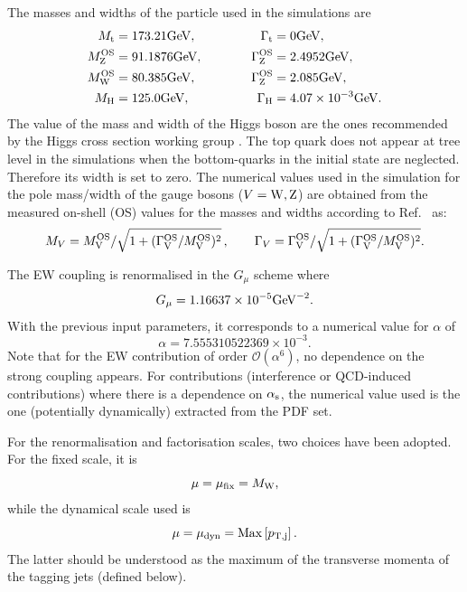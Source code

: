 \documentclass[11pt]{cernrep}
\newcommand{\MP}[1]{{ {\color{blue}{ [MP: #1]}} }}
\begin{document}
The masses and widths of the particle used in the simulations are
%
\begin{alignat}{2}
                M_{\rm t}   &=  173.21 {\rm GeV},             & \quad \quad \quad \Gamma_{\rm t} &= 0 {\rm GeV},  \nonumber \\
                M_{\rm Z}^{\rm OS} &=  91.1876{\rm GeV},      & \quad \quad \quad \Gamma^{\rm OS}_{\rm Z} &= 2.4952{\rm GeV},  \nonumber \\
                M_{\rm W}^{\rm OS} &=  80.385{\rm GeV},       & \Gamma^{\rm OS}_{\rm Z} &= 2.085{\rm GeV},  \nonumber \\
                M_{\rm H} &=  125.0{\rm GeV}, 		      & \Gamma_{\rm H}   &=  4.07 \times 10^{-3}{\rm GeV}.
\end{alignat}
%
The value of the mass and width of the Higgs boson are the ones recommended by the Higgs cross section working group \cite{deFlorian:2016spz}.
The top quark does not appear at tree level in the simulations when the bottom-quarks in the initial state are neglected.
Therefore its width is set to zero.
The numerical values used in the simulation for the pole mass/width of the gauge bosons ($V={\rm W,Z}$) are obtained from the measured on-shell (OS) values for the masses and widths according to Ref.~\cite{Bardin:1988xt} as:
%
\begin{equation}
        M_V = M_{\rm V}^{\rm OS}/\sqrt{1+(\Gamma_{\rm V}^{\rm OS}/M_{\rm V}^{\rm OS})^2}\,,\qquad  \Gamma_V = \Gamma_{\rm V}^{\rm OS}/\sqrt{1+(\Gamma_{\rm V}^{\rm OS}/M_{\rm V}^{\rm OS})^2}.
\end{equation}

%
The EW coupling is renormalised in the $G_\mu$ scheme \cite{Denner:2000bj} where
%
\begin{equation}
    G_{\mu}    = 1.16637\times 10^{-5}{\rm GeV}^{-2}.
\end{equation}
%
With the previous input parameters, it corresponds to a numerical value for $\alpha$ of
%
\begin{equation}
 \alpha = 7.555310522369 \times 10^{-3}.
\end{equation}
%
Note that for the EW contribution of order $\mathcal{O} (\alpha^6)$, no dependence on the strong coupling appears.
For contributions (interference or QCD-induced contributions) where there is a dependence on $\alpha_{\rm s}$, the numerical value used is the one (potentially dynamically) extracted from the PDF set.

For the renormalisation and factorisation scales, two choices have been adopted.
For the fixed scale, it is
%
\begin{equation}
 \mu = \mu_{\rm fix} = M_{\rm W},
\end{equation}
%
while the dynamical scale used is
%
\begin{equation}
 \mu = \mu_{\rm dyn} = {\rm Max}\left[p_{\rm T, j}\right].
\end{equation}
%
The latter should be understood as the maximum of the transverse momenta of the tagging jets (defined below).
\MP{Justification for this scale choice?}
\end{document}
